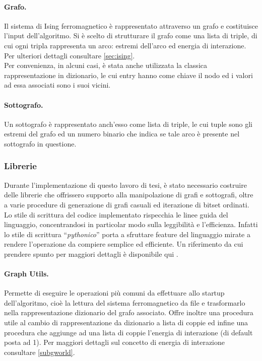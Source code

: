 \paragraph{Grafo.} Il sistema di Ising ferromagnetico è rappresentato attraverso un grafo e costituisce l'input dell'algoritmo. Si è scelto di strutturare il grafo come una lista di triple, di cui ogni tripla rappresenta un arco: estremi dell'arco ed energia di interazione. Per ulteriori dettagli consultare \ref{sec:ising}.\\
Per convenienza, in alcuni casi, è stata anche utilizzata la classica rappresentazione in dizionario, le cui entry hanno come chiave il nodo ed i valori ad essa associati sono i suoi vicini.
\paragraph{Sottografo.} Un sottografo è rappresentato anch'esso come lista di triple, le cui tuple sono gli estremi del grafo ed un numero binario che indica se tale arco è presente nel sottografo in questione.
\subsubsection{Librerie}
Durante l'implementazione di questo lavoro di tesi, è stato necessario costruire delle librerie che offrissero supporto alla manipolazione di grafi e sottografi, oltre a varie procedure di generazione di grafi casuali ed iterazione di bitset ordinati.\\
Lo stile di scrittura del codice implementato rispecchia le linee guida del linguaggio, concentrandosi in particolar modo sulla leggibilità e l'efficienza. Infatti lo stile di scrittura ``\textit{pythonico}'' porta a sfruttare feature del linguaggio mirate a rendere l'operazione da compiere semplice ed efficiente. Un riferimento da cui prendere spunto per maggiori dettagli è disponibile qui \cite{perftips}.
\paragraph{Graph Utils.}
Permette di eseguire le operazioni più comuni da effettuare allo startup dell'algoritmo, cioè la lettura del sistema ferromagnetico da file e trasformarlo nella rappresentazione dizionario del grafo associato. Offre inoltre una procedura utile al cambio di rappresentazione da dizionario a lista di coppie ed infine una procedura che aggiunge ad una lista di coppie l'energia di interazione (di default posta ad 1). Per maggiori dettagli sul concetto di energia di interazione consultare \ref{subgworld}.
